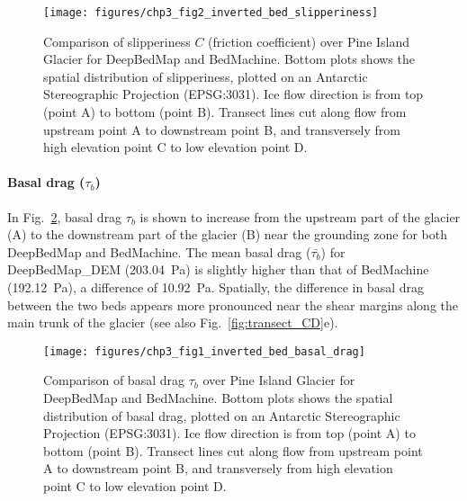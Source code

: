 \begin{figure}[htbp]
  \texttt{[image: figures/chp3\_fig2\_inverted\_bed\_slipperiness]}
  \caption[Comparison of slipperiness over Pine Island Glacier for DeepBedMap and BedMachine]{
    Comparison of slipperiness $C$ (friction coefficient) over Pine Island Glacier for DeepBedMap and BedMachine.
    Bottom plots shows the spatial distribution of slipperiness, plotted on an Antarctic Stereographic Projection (EPSG:3031).
    Ice flow direction is from top (point A) to bottom (point B).
    Transect lines cut along flow from upstream point A to downstream point B, and transversely from high elevation point C to low elevation point D.
  }
  \label{fig:slipperiness}
\end{figure}


\clearpage
\paragraph{Basal drag ($\tau_b$)}

In Fig.~\ref{fig:basal_drag}, basal drag $\tau_b$ is shown to increase from the upstream part of the glacier (A) to the downstream part of the glacier (B) near the grounding zone for both DeepBedMap and BedMachine.
The mean basal drag ($\bar{\tau_b}$) for DeepBedMap\_DEM (\SI{203.04}{\pascal}) is slightly higher than that of BedMachine (\SI{192.12}{\pascal}), a difference of \SI{10.92}{\pascal}.
Spatially, the difference in basal drag between the two beds appears more pronounced near the shear margins along the main trunk of the glacier (see also Fig.~\ref{fig:transect_CD}e).


\begin{figure}[htbp]
  \texttt{[image: figures/chp3\_fig1\_inverted\_bed\_basal\_drag]}
  \caption[Comparison of basal drag over Pine Island Glacier for DeepBedMap and BedMachine]{
    Comparison of basal drag $\tau_b$ over Pine Island Glacier for DeepBedMap and BedMachine.
    Bottom plots shows the spatial distribution of basal drag, plotted on an Antarctic Stereographic Projection (EPSG:3031).
    Ice flow direction is from top (point A) to bottom (point B).
    Transect lines cut along flow from upstream point A to downstream point B, and transversely from high elevation point C to low elevation point D.
  }
  \label{fig:basal_drag}
\end{figure}


